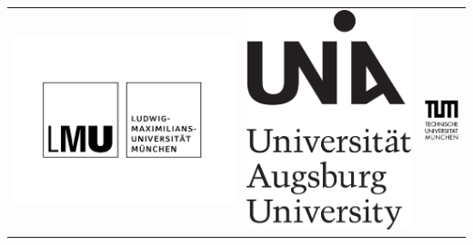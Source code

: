 \newpage
\thispagestyle{empty}
\mbox{}
\newpage
\thispagestyle{empty}

\begin{table}[h]
\centering
\begin{tabular}{ccc}
\includegraphics[width=.18\linewidth]{img/logos/lmu_logo} \hspace{0.7cm} &
\includegraphics[scale=0.18]{img/logos/Uni_Aug_Logo_Basis_pos_A}
\hspace{0.7cm} &
\includegraphics[scale=0.86]{img/logos/tum}
\end{tabular}
\end{table}

